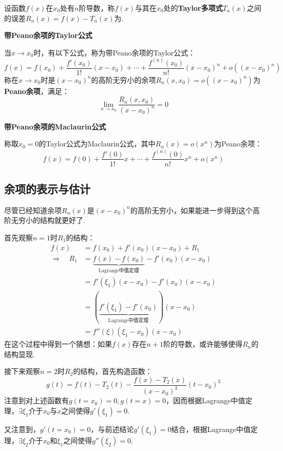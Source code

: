 \begin{definition}
    设函数$f(x)$在$x_0$处有$n$阶导数，称$f(x)$与其在$x_0$处的\textbf{Taylor多项式}$T_n(x)$之间的误差$R_n(x) = f(x)-T_n(x)$为.
\end{definition}

\begin{theorem}
    \textbf{带Peano余项的Taylor公式}

    当$x \to x_0$时，有以下公式，称为带Peano余项的Taylor公式：
    \[f(x) = f(x_0) + \frac{f'(x_0)}{1!}(x-x_0) + \cdots + \frac{f^{(n)}(x_0)}{n!}(x-x_0)^n + o((x-x_0)^n)\]
    称在$x \to x_0$时是$(x-x_0)^n$的高阶无穷小的余项$R_n(x,x_0) = o((x-x_0)^n)$为\textbf{Peano余项}，满足：
    \[\lim\limits_{x \to x_0}\frac{R_n(x,x_0)}{(x-x_0)^n} = 0\]
\end{theorem}

\begin{theorem}
    \textbf{带Peano余项的Maclaurin公式}

    称取$x_0=0$的Taylor公式为Maclaurin公式，其中$R_n(x) = o(x^n)$为Peano余项：
    \[f(x) = f(0) + \frac{f'(0)}{1!}x + \cdots + \frac{f^{(n)}(0)}{n!}x^n + o(x^n)\]
\end{theorem}


\subsection{余项的表示与估计}
尽管已经知道余项$R_n(x)$是$(x-x_0)^n$的高阶无穷小，如果能进一步得到这个高阶无穷小的结构就更好了.

首先观察$n=1$时$R_1$的结构：
\begin{align*}
f(x) &= f(x_0) + f'(x_0)(x-x_0) + R_1\\
    \Rightarrow\quad R_1 &= \underbrace{f(x)-f(x_0)}_\text{Lagrange中值定理}-f'(x_0)(x-x_0)\\
    &= f'(\xi_1)(x-x_0) - f'(x_0)(x-x_0)\\
    &= (\underbrace{f'(\xi_1) - f'(x_0)}_\text{Lagrange中值定理})(x-x_0)\\
    &= f''(\xi)(\xi_1 - x_0)(x-x_0)
\end{align*}
在这个过程中得到一个猜想：如果$f(x)$存在$n+1$阶的导数，或许能够使得$R_n$的结构显现.

接下来观察$n=2$时$R_2$的结构，首先构造函数：
\[g(t) = f(t) - T_2(t) - \frac{f(x)-T_2(x)}{(x-x_0)^3}(t-x_0)^3\]
注意到对上述函数有$g(t=x_0)=0,g(t=x)=0$，因而根据Lagrange中值定理，$\exists \xi_1$介于$x_0$与$x$之间使得$g'(\xi_1) = 0$.

又注意到，$g'(t=x_0) = 0$，与前述结论$g'(\xi_1) = 0$结合，根据Lagrange中值定理，$\exists \xi_2$介于$x_0$和$\xi_1$之间使得$g''(\xi_2) = 0$.

